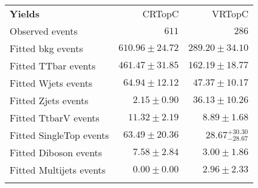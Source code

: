 

\begin{table}
\begin{center}
\setlength{\tabcolsep}{0.0pc}
{\small
\begin{tabular*}{\textwidth}{@{\extracolsep{\fill}}lrr}
\noalign{\smallskip}\hline\noalign{\smallskip}
{\bf Yields}           & CRTopC        & VRTopC          \\[-0.05cm]
\noalign{\smallskip}\hline\noalign{\smallskip}
Observed events          & $611$           & $286$                   \\
\noalign{\smallskip}\hline\noalign{\smallskip}
Fitted bkg events         & $610.96 \pm 24.72$         & $289.20 \pm 34.10$             \\
\noalign{\smallskip}\hline\noalign{\smallskip}
        Fitted TTbar events         & $461.47 \pm 31.85$         & $162.19 \pm 18.77$            \\
        Fitted Wjets events         & $64.94 \pm 12.12$          & $47.37 \pm 10.17$            \\
        Fitted Zjets events         & $2.15 \pm 0.90$          & $36.13 \pm 10.26$            \\
        Fitted TtbarV events         & $11.32 \pm 2.19$           & $8.89 \pm 1.68$           \\
        Fitted SingleTop events         & $63.49 \pm 20.36$          & $28.67_{-28.67}^{+30.30}$                  \\
        Fitted Diboson events         & $7.58 \pm 2.84$          & $3.00 \pm 1.86$            \\
        Fitted Multijets events         & $0.00 \pm 0.00$               & $2.96 \pm 2.33$       \\
 \noalign{\smallskip}\hline\noalign{\smallskip}

\end{tabular*}}
\end{center}
\end{table}
